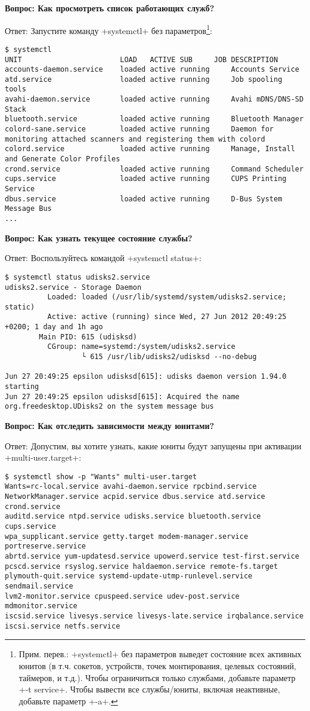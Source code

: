 \documentclass[10pt,oneside,a4paper]{article}
\newcommand{\qna}[1]{\medskip\par\textbf{Вопрос: #1}\nopagebreak\par Ответ:}
\begin{document}
\qna{Как просмотреть список работающих служб?}
Запустите команду +systemctl+ без параметров\footnote{Прим. перев.: +systemctl+
без параметров выведет состояние всех активных юнитов (в т.ч. сокетов,
устройств, точек монтирования, целевых состояний, таймеров, и т.д.). Чтобы
ограничиться только службами, добавьте параметр +-t service+. Чтобы вывести все
службы/юниты, включая неактивные, добавьте параметр +-a+.}:
\begin{Verbatim}[fontsize=\small]
$ systemctl
UNIT                       LOAD   ACTIVE SUB     JOB DESCRIPTION
accounts-daemon.service    loaded active running     Accounts Service
atd.service                loaded active running     Job spooling tools
avahi-daemon.service       loaded active running     Avahi mDNS/DNS-SD Stack
bluetooth.service          loaded active running     Bluetooth Manager
colord-sane.service        loaded active running     Daemon for monitoring attached scanners and registering them with colord
colord.service             loaded active running     Manage, Install and Generate Color Profiles
crond.service              loaded active running     Command Scheduler
cups.service               loaded active running     CUPS Printing Service
dbus.service               loaded active running     D-Bus System Message Bus
...
\end{Verbatim}

\qna{Как узнать текущее состояние службы?}
Воспользуйтесь командой +systemctl status+:
\begin{Verbatim}[fontsize=\small]
$ systemctl status udisks2.service
udisks2.service - Storage Daemon
          Loaded: loaded (/usr/lib/systemd/system/udisks2.service; static)
          Active: active (running) since Wed, 27 Jun 2012 20:49:25 +0200; 1 day and 1h ago
        Main PID: 615 (udisksd)
          CGroup: name=systemd:/system/udisks2.service
                  └ 615 /usr/lib/udisks2/udisksd --no-debug

Jun 27 20:49:25 epsilon udisksd[615]: udisks daemon version 1.94.0 starting
Jun 27 20:49:25 epsilon udisksd[615]: Acquired the name org.freedesktop.UDisks2 on the system message bus
\end{Verbatim}

\qna{Как отследить зависимости между юнитами?}
Допустим, вы хотите узнать, какие юниты будут запущены при активации
+multi-user.target+:
\begin{Verbatim}
$ systemctl show -p "Wants" multi-user.target
Wants=rc-local.service avahi-daemon.service rpcbind.service
NetworkManager.service acpid.service dbus.service atd.service crond.service
auditd.service ntpd.service udisks.service bluetooth.service cups.service
wpa_supplicant.service getty.target modem-manager.service portreserve.service
abrtd.service yum-updatesd.service upowerd.service test-first.service
pcscd.service rsyslog.service haldaemon.service remote-fs.target
plymouth-quit.service systemd-update-utmp-runlevel.service sendmail.service
lvm2-monitor.service cpuspeed.service udev-post.service mdmonitor.service
iscsid.service livesys.service livesys-late.service irqbalance.service
iscsi.service netfs.service	
\end{Verbatim}
\end{document}
